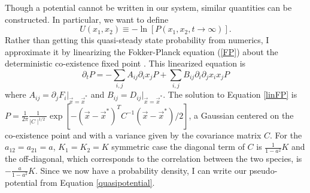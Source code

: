Though a potential cannot be written in our system, similar quantities can be constructed. 
In particular, we want to define
\begin{equation}
U(x_1,x_2) \equiv -\ln\left[P(x_1,x_2,t\rightarrow\infty)\right].
\label{quasipotential}
\end{equation}
Rather than getting this quasi-steady state probability from numerics, I approximate it by linearizing the Fokker-Planck equation (\ref{FP}) about the deterministic co-existence fixed point \cite{VanKampen1992}. 
This linearized equation is
\begin{equation}
\partial_t P = -\sum_{i,j} A_{ij}\partial_i x_j P + \sum_{i,j} B_{ij} \partial_i\partial_j x_i x_j P
\label{linFP}
\end{equation}
where $A_{ij}=\partial_j F_i \lvert_{\vec{x}=\vec{x}^*}$ and $B_{ij}=D_{ij} \lvert_{\vec{x}=\vec{x}^*}$. 
The solution to Equation \ref{linFP} is $P=\frac{1}{2\pi}\frac{1}{\mid C\mid^{1/2}}\exp[-(\vec{x} - \vec{x}^*)^T C^{-1}(\vec{x} - \vec{x}^*)/2]$, a Gaussian centered on the co-existence point and with a variance given by the covariance matrix $C$. 
For the $a_{12}=a_{21}=a$, $K_1=K_2=K$ symmetric case the diagonal term of $C$ is $\frac{1}{1-a^2}K$ and the off-diagonal, which corresponds to the correlation between the two species, is $-\frac{a}{1-a^2}K$. 
Since we now have a probability density, I can write our pseudo-potential from Equation \ref{quasipotential}. 

